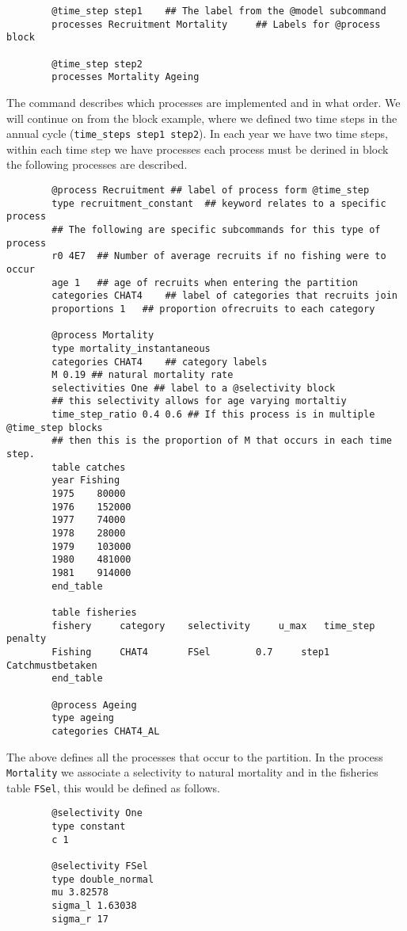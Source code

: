 {\small{\begin{verbatim}
		@time_step step1 	## The label from the @model subcommand
		processes Recruitment Mortality 	## Labels for @process block
		
		@time_step step2 
		processes Mortality Ageing
		\end{verbatim}}}

The  command describes which processes are implemented and in what order. We will continue on from the  block example, where we defined two time steps in the annual cycle (\texttt{time\_steps step1 step2}). In each year we have two time steps, within each time step we have processes each process must be derined in  block the following processes are described.

{\small{\begin{verbatim}
		@process Recruitment ## label of process form @time_step
		type recruitment_constant  ## keyword relates to a specific process
		## The following are specific subcommands for this type of process
		r0 4E7	## Number of average recruits if no fishing were to occur
		age 1	## age of recruits when entering the partition
		categories CHAT4	## label of categories that recruits join
		proportions 1	## proportion ofrecruits to each category
		
		@process Mortality 
		type mortality_instantaneous
		categories CHAT4	## category labels
		M 0.19 ## natural mortality rate
		selectivities One ## label to a @selectivity block
		## this selectivity allows for age varying mortaltiy
		time_step_ratio 0.4 0.6 ## If this process is in multiple @time_step blocks
		## then this is the proportion of M that occurs in each time step.
		table catches
		year Fishing 
		1975	80000
		1976	152000
		1977	74000
		1978	28000
		1979	103000
		1980	481000
		1981	914000
		end_table
		
		table fisheries
		fishery  	category 	selectivity 	u_max 	time_step 	penalty
		Fishing   	CHAT4   	FSel 		0.7 	step1 		Catchmustbetaken
		end_table
		
		@process Ageing
		type ageing
		categories CHAT4_AL
		\end{verbatim}}}

The above defines all the processes that occur to the partition. In the process  \texttt{Mortality} we associate a selectivity to natural mortality and in the fisheries table \texttt{FSel}, this would be defined as follows. 
{\small{\begin{verbatim}
		@selectivity One
		type constant 
		c 1
		
		@selectivity FSel
		type double_normal 
		mu 3.82578 
		sigma_l 1.63038 
		sigma_r 17
		\end{verbatim}}}

